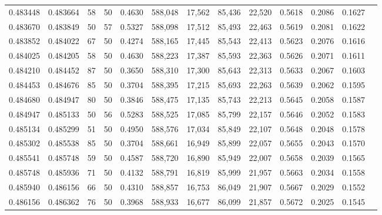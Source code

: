 \begin{tabular}{rrrrrrrrrrrrr}
0.483448 & 0.483664 &    58 &  50 &                                     0.4630 & 588,048 &  17,562 &  85,436 &  22,520 & 0.5618 & 0.2086 & 0.1627 \\
0.483670 & 0.483849 &    50 &  57 &                                     0.5327 & 588,098 &  17,512 &  85,493 &  22,463 & 0.5619 & 0.2081 & 0.1622 \\
0.483852 & 0.484022 &    67 &  50 &                                     0.4274 & 588,165 &  17,445 &  85,543 &  22,413 & 0.5623 & 0.2076 & 0.1616 \\
0.484025 & 0.484205 &    58 &  50 &                                     0.4630 & 588,223 &  17,387 &  85,593 &  22,363 & 0.5626 & 0.2071 & 0.1611 \\
0.484210 & 0.484452 &    87 &  50 &                                     0.3650 & 588,310 &  17,300 &  85,643 &  22,313 & 0.5633 & 0.2067 & 0.1603 \\
0.484453 & 0.484676 &    85 &  50 &                                     0.3704 & 588,395 &  17,215 &  85,693 &  22,263 & 0.5639 & 0.2062 & 0.1595 \\
0.484680 & 0.484947 &    80 &  50 &                                     0.3846 & 588,475 &  17,135 &  85,743 &  22,213 & 0.5645 & 0.2058 & 0.1587 \\
0.484947 & 0.485133 &    50 &  56 &                                     0.5283 & 588,525 &  17,085 &  85,799 &  22,157 & 0.5646 & 0.2052 & 0.1583 \\
0.485134 & 0.485299 &    51 &  50 &                                     0.4950 & 588,576 &  17,034 &  85,849 &  22,107 & 0.5648 & 0.2048 & 0.1578 \\
0.485302 & 0.485538 &    85 &  50 &                                     0.3704 & 588,661 &  16,949 &  85,899 &  22,057 & 0.5655 & 0.2043 & 0.1570 \\
0.485541 & 0.485748 &    59 &  50 &                                     0.4587 & 588,720 &  16,890 &  85,949 &  22,007 & 0.5658 & 0.2039 & 0.1565 \\
0.485748 & 0.485936 &    71 &  50 &                                     0.4132 & 588,791 &  16,819 &  85,999 &  21,957 & 0.5663 & 0.2034 & 0.1558 \\
0.485940 & 0.486156 &    66 &  50 &                                     0.4310 & 588,857 &  16,753 &  86,049 &  21,907 & 0.5667 & 0.2029 & 0.1552 \\
0.486156 & 0.486362 &    76 &  50 &                                     0.3968 & 588,933 &  16,677 &  86,099 &  21,857 & 0.5672 & 0.2025 & 0.1545 \\

\end{tabular}

